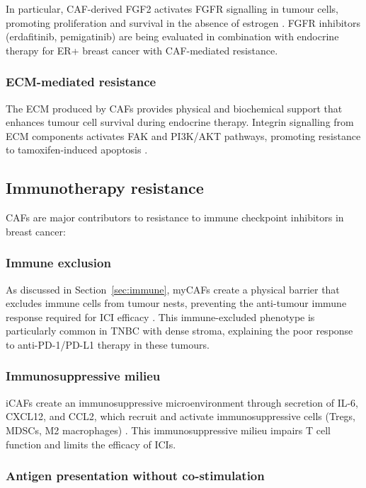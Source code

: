 In particular, CAF-derived FGF2 activates FGFR signalling in tumour cells, promoting proliferation and survival in the absence of estrogen \citep{seth2021}. FGFR inhibitors (erdafitinib, pemigatinib) are being evaluated in combination with endocrine therapy for ER+ breast cancer with CAF-mediated resistance.

\subsubsection{ECM-mediated resistance}

The ECM produced by CAFs provides physical and biochemical support that enhances tumour cell survival during endocrine therapy. Integrin signalling from ECM components activates FAK and PI3K/AKT pathways, promoting resistance to tamoxifen-induced apoptosis \citep{seth2021}.

\subsection{Immunotherapy resistance}

CAFs are major contributors to resistance to immune checkpoint inhibitors in breast cancer:

\subsubsection{Immune exclusion}

As discussed in Section~\ref{sec:immune}, myCAFs create a physical barrier that excludes immune cells from tumour nests, preventing the anti-tumour immune response required for ICI efficacy \citep{chhabra2023}. This immune-excluded phenotype is particularly common in TNBC with dense stroma, explaining the poor response to anti-PD-1/PD-L1 therapy in these tumours.

\subsubsection{Immunosuppressive milieu}

iCAFs create an immunosuppressive microenvironment through secretion of IL-6, CXCL12, and CCL2, which recruit and activate immunosuppressive cells (Tregs, MDSCs, M2 macrophages) \citep{erve2024}. This immunosuppressive milieu impairs T cell function and limits the efficacy of ICIs.

\subsubsection{Antigen presentation without co-stimulation}

